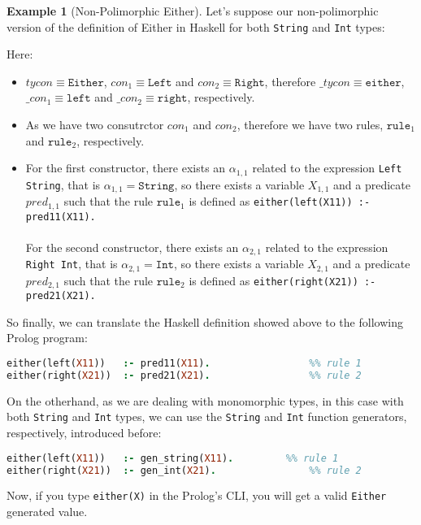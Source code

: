 \documentclass{report}
\theoremstyle{definition}
\newtheorem{example}{Example}[section]
\theoremstyle{definition}
\newcommand{\ttt}[1]{\texttt{#1}}
\begin{document}
\begin{example}[Non-Polimorphic Either]
	Let's suppose our non-polimorphic version of the definition of Either in Haskell for both \ttt{String} and \ttt{Int} types:
	
	Here:
	\begin{itemize}
		\item $tycon \equiv \ttt{Either}$, $con_1 \equiv \ttt{Left}$ and $con_2 \equiv \ttt{Right}$, therefore $\_tycon \equiv \ttt{either}$, $\_con_1 \equiv \ttt{left}$ and $\_con_2 \equiv \ttt{right}$, respectively.
		\item As we have two consutrctor $con_1$ and $con_2$, therefore we have two rules, $\ttt{rule}_1$ and $\ttt{rule}_2$, respectively.
		\item For the first constructor, there exists an $\alpha_{1,1}$ related to the expression \ttt{Left String}, that is $\alpha_{1,1} = \ttt{String}$, so there exists a variable $X_{1,1}$ and a predicate $pred_{1,1}$ such that the rule $\ttt{rule}_1$ is defined as \ttt{either(left(X11)) :- pred11(X11).}\\\\
		For the second constructor, there exists an $\alpha_{2,1}$ related to the expression \ttt{Right Int}, that is $\alpha_{2,1} = \ttt{Int}$, so there exists a variable $X_{2,1}$ and a predicate $pred_{2,1}$ such that the rule $\ttt{rule}_2$ is defined as \ttt{either(right(X21)) :- pred21(X21).}
	\end{itemize}
	So finally, we can translate the Haskell definition showed above to the following Prolog program:\\
\begin{lstlisting}[language=Prolog]
either(left(X11)) 	:- pred11(X11).					%% rule 1
either(right(X21)) 	:- pred21(X21).					%% rule 2
\end{lstlisting}
On the otherhand, as we are dealing with monomorphic types, in this case with both \ttt{String} and \ttt{Int} types, we can use the \ttt{String} and \ttt{Int} function generators, respectively, introduced before:\\
\begin{lstlisting}[language=Prolog]
either(left(X11)) 	:- gen_string(X11).			%% rule 1
either(right(X21)) 	:- gen_int(X21).				%% rule 2
\end{lstlisting}
Now, if you type \ttt{either(X)} in the Prolog's CLI, you will get a valid \ttt{Either} generated value.
\end{example}
\end{document}
